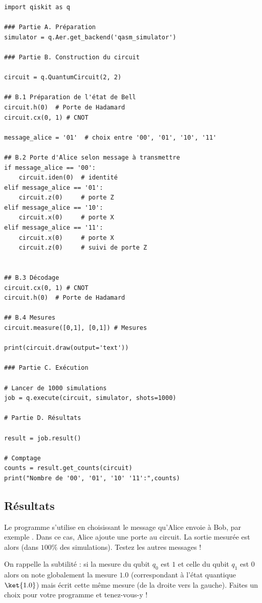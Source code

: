 \documentclass[11pt,class=report,crop=false]{standalone}
\begin{document}
\begin{lstlisting}
import qiskit as q

### Partie A. Préparation
simulator = q.Aer.get_backend('qasm_simulator')

### Partie B. Construction du circuit

circuit = q.QuantumCircuit(2, 2)

## B.1 Préparation de l'état de Bell
circuit.h(0)  # Porte de Hadamard
circuit.cx(0, 1) # CNOT

message_alice = '01'  # choix entre '00', '01', '10', '11'

## B.2 Porte d'Alice selon message à transmettre
if message_alice == '00':
	circuit.iden(0)  # identité
elif message_alice == '01':
	circuit.z(0)     # porte Z
elif message_alice == '10':
	circuit.x(0)     # porte X
elif message_alice == '11':
	circuit.x(0)     # porte X
	circuit.z(0)     # suivi de porte Z	


## B.3 Décodage
circuit.cx(0, 1) # CNOT
circuit.h(0)  # Porte de Hadamard

## B.4 Mesures
circuit.measure([0,1], [0,1]) # Mesures

print(circuit.draw(output='text'))

### Partie C. Exécution 

# Lancer de 1000 simulations
job = q.execute(circuit, simulator, shots=1000)

# Partie D. Résultats

result = job.result()

# Comptage
counts = result.get_counts(circuit)
print("Nombre de '00', '01', '10' '11':",counts)
\end{lstlisting}


\subsection{Résultats}

Le programme s'utilise en choisissant le message qu'Alice envoie à Bob, par exemple . Dans ce cas, Alice ajoute une porte  au circuit. La sortie mesurée est alors  (dans $100\%$ des simulations). Testez les autres messages !

On rappelle la subtilité : si la mesure du qubit $q_0$ est $1$ et celle du qubit $q_1$ est $0$ alors on note globalement la mesure $1.0$ (correspondant à l'état quantique $\ket{1.0}$) mais \qiskit{} écrit cette même mesure  (de la droite vers la gauche). Faites un choix pour votre programme et tenez-vous-y !
\end{document}
